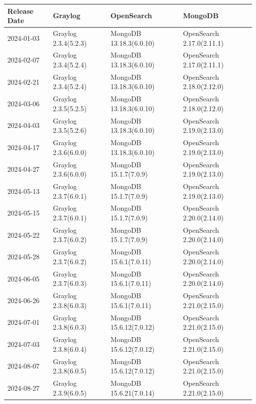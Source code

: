 \documentclass[../main.tex]{subfiles}
\begin{document}
\begin{table}[h]
    \centering
    \begin{tabular}{|l|l|l|l|}
    \hline
    \textbf{Release Date} & \textbf{Graylog} & \textbf{OpenSearch} & \textbf{MongoDB} \\ \hline
    2024-01-03 & Graylog 2.3.4(5.2.3) & MongoDB 13.18.3(6.0.10) & OpenSearch 2.17.0(2.11.1) \\ \hline
    2024-02-07 & Graylog 2.3.4(5.2.4) & MongoDB 13.18.3(6.0.10) & OpenSearch 2.17.0(2.11.1) \\ \hline
    2024-02-21 & Graylog 2.3.4(5.2.4) & MongoDB 13.18.3(6.0.10) & OpenSearch 2.18.0(2.12.0) \\ \hline
    2024-03-06 & Graylog 2.3.5(5.2.5) & MongoDB 13.18.3(6.0.10) & OpenSearch 2.18.0(2.12.0) \\ \hline
    2024-04-03 & Graylog 2.3.5(5.2.6) & MongoDB 13.18.3(6.0.10) & OpenSearch 2.19.0(2.13.0) \\ \hline
    2024-04-17 & Graylog 2.3.6(6.0.0) & MongoDB 13.18.3(6.0.10) & OpenSearch 2.19.0(2.13.0) \\ \hline
    2024-04-27 & Graylog 2.3.6(6.0.0) & MongoDB 15.1.7(7.0.9) & OpenSearch 2.19.0(2.13.0) \\ \hline
    2024-05-13 & Graylog 2.3.7(6.0.1) & MongoDB 15.1.7(7.0.9) & OpenSearch 2.19.0(2.13.0) \\ \hline
    2024-05-15 & Graylog 2.3.7(6.0.1) & MongoDB 15.1.7(7.0.9) & OpenSearch 2.20.0(2.14.0) \\ \hline
    2024-05-22 & Graylog 2.3.7(6.0.2) & MongoDB 15.1.7(7.0.9) & OpenSearch 2.20.0(2.14.0) \\ \hline
    2024-05-28 & Graylog 2.3.7(6.0.2) & MongoDB 15.6.1(7.0.11) & OpenSearch 2.20.0(2.14.0) \\ \hline
    2024-06-05 & Graylog 2.3.7(6.0.3) & MongoDB 15.6.1(7.0.11) & OpenSearch 2.20.0(2.14.0) \\ \hline
    2024-06-26 & Graylog 2.3.8(6.0.3) & MongoDB 15.6.1(7.0.11) & OpenSearch 2.21.0(2.15.0) \\ \hline
    2024-07-01 & Graylog 2.3.8(6.0.3) & MongoDB 15.6.12(7.0.12) & OpenSearch 2.21.0(2.15.0) \\ \hline
    2024-07-03 & Graylog 2.3.8(6.0.4) & MongoDB 15.6.12(7.0.12) & OpenSearch 2.21.0(2.15.0) \\ \hline
    2024-08-07 & Graylog 2.3.8(6.0.5) & MongoDB 15.6.12(7.0.12) & OpenSearch 2.21.0(2.15.0) \\ \hline
    2024-08-27 & Graylog 2.3.9(6.0.5) & MongoDB 15.6.21(7.0.14) & OpenSearch 2.21.0(2.15.0) \\ \hline

\end{tabular}
\end{table}
\end{document}
